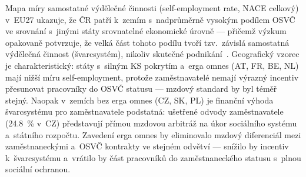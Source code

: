 Mapa míry samostatné výdělečné činnosti (self-employment rate, \ac{NACE} celkový) v~EU27 ukazuje, že ČR patří k~zemím s~nadprůměrně vysokým podílem \ac{OSVČ} ve srovnání s~jinými státy srovnatelné ekonomické úrovně --- přičemž výzkum opakovaně potvrzuje, že velká část tohoto podílu tvoří tzv.~závislá samostatná výdělečná činnost (švarcsystém), nikoliv skutečné podnikání~\cite{eurostat_lfsa_egaps}.
Geografický vzorec je charakteristický: státy s~silným \ac{KS} pokrytím a~erga omnes (AT, FR, BE, NL) mají nižší míru self-employment, protože zaměstnavatelé nemají výrazný incentiv přesunovat pracovníky do \ac{OSVČ} statusu --- mzdový standard by byl téměř stejný.
Naopak v~zemích bez erga omnes (CZ, SK, PL) je finanční výhoda švarcsystému pro zaměstnavatele podstatná: ušetřené odvody zaměstnavatele (\SI{24.8}{\percent} v~CZ) představují přímou mzdovou arbitráž na úkor sociálního systému a~státního rozpočtu.
Zavedení erga omnes by eliminovalo mzdový diferenciál mezi zaměstnaneckými a~\ac{OSVČ} kontrakty ve stejném odvětví --- snížilo by incentiv k~švarcsystému a~vrátilo by část pracovníků do zaměstnaneckého statusu s~plnou sociální ochranou.


